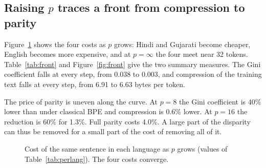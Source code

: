 \documentclass[11pt,a4paper]{article}
\theoremstyle{remark}
\begin{document}
\subsection{Raising $p$ traces a front from compression to parity}

Figure~\ref{fig:perlang} shows the four costs as $p$ grows: Hindi and Gujarati become
cheaper, English becomes more expensive, and at $p=\infty$ the four meet near 32 tokens.
Table~\ref{tab:front} and Figure~\ref{fig:front} give the two summary measures. The Gini
coefficient falls at every step, from 0.038 to 0.003, and compression of the training text
falls at every step, from 6.91 to 6.63 bytes per token.

The price of parity is uneven along the curve. At $p=8$ the Gini coefficient is 40\% lower
than under classical BPE and compression is 0.6\% lower. At $p=16$ the reduction is 60\% for
1.3\%. Full parity costs 4.0\%. A large part of the disparity can thus be removed for a small
part of the cost of removing all of it.

\begin{figure}[t]
\centering
{}
\caption{Cost of the same sentence in each language as $p$ grows (values of
Table~\ref{tab:perlang}). The four costs converge.}
\label{fig:perlang}
\end{figure}
\end{document}
